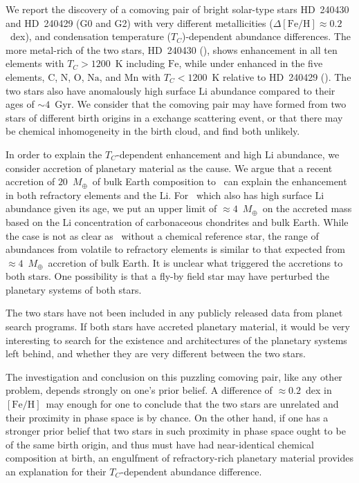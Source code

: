 \documentclass[modern, letterpaper]{aastex61}
\newcommand*\elem[1]{\ensuremath{\mathrm{#1}}}
\newcommand*\elemH[1]{\ensuremath{[\mathrm{#1}/\elem{H}]}}
\newcommand*{\feh}{\ensuremath{\elemH{Fe}}}
\newcommand{\sunanalog}{\text{Krios}}
\newcommand{\bizarreone}{\text{Kronos}}
\newcommand{\Tcondens}{\ensuremath{T_C}}
\newcommand{\mearth}{\ensuremath{M_\oplus}}
\begin{document}
We report the discovery of a comoving pair of bright
solar-type stars HD~240430 and HD~240429 (G0 and G2) with very different
metallicities ($\Delta\feh \approx 0.2$~dex), and condensation temperature
(\Tcondens)-dependent abundance differences.
The more metal-rich of the two stars, HD~240430 (\bizarreone), shows enhancement in
all ten elements with $\Tcondens > 1200$~K including \elem{Fe}, while under
enhanced in the five elements, \elem{C}, \elem{N}, \elem{O}, \elem{Na}, and
\elem{Mn} with $\Tcondens < 1200$~K relative to HD~240429 (\sunanalog).
The two stars also have anomalously high surface \elem{Li} abundance compared
to their ages of $\sim 4$~Gyr.
We consider that the comoving pair may have formed from two stars of different
birth origins in a exchange scattering event, or that there may be chemical
inhomogeneity in the birth cloud, and find both unlikely.

In order to explain the $\Tcondens$-dependent enhancement and high \elem{Li}
abundance, we consider accretion of planetary material as the cause.
We argue that a recent accretion of $20$~\mearth\ of bulk Earth
composition to \bizarreone\ can explain the enhancement in both refractory
elements and the \elem{Li}.
For \sunanalog\ which also has high surface \elem{Li} abundance given its age,
we put an upper limit of $\approx 4$~\mearth\ on the accreted mass
based on the \elem{Li} concentration of carbonaceous chondrites and bulk Earth.
While the case is not as clear as \bizarreone\ without a chemical reference star,
the range of abundances from volatile to refractory elements is
similar to that expected from $\approx 4$~\mearth\ accretion of bulk Earth.
It is unclear what triggered the accretions to both stars.
One possibility is that a fly-by field star may have
perturbed the planetary systems of both stars.

The two stars have not been included in any publicly released data from planet
search programs.
If both stars have accreted planetary material, it would be very interesting to
search for the existence and architectures of the planetary systems left
behind, and whether they are very different between the two stars.

The investigation and conclusion on this puzzling comoving pair, like any other
problem, depends strongly on one's prior belief.
A difference of $\approx 0.2$~dex in \feh\ may enough for one to conclude that
the two stars are unrelated and their proximity in phase space is by chance.
On the other hand, if one has a stronger prior belief that two stars in such
proximity in phase space ought to be of the same birth origin, and thus
must have had near-identical chemical composition at birth, an engulfment of
refractory-rich planetary material provides an explanation for their
$\Tcondens$-dependent abundance difference.
\end{document}
